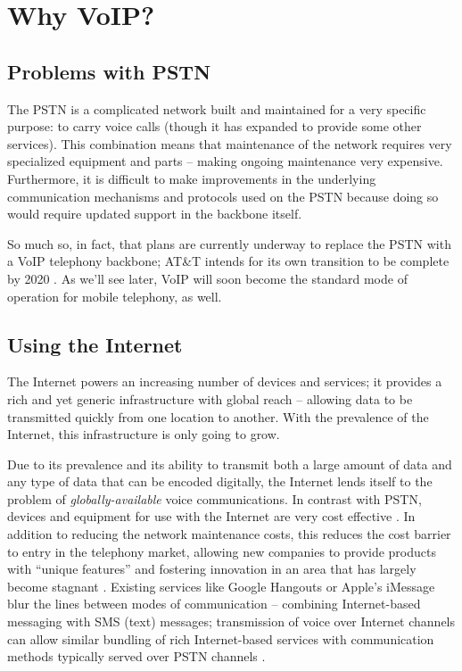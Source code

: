 \documentclass[11pt]{article}
\begin{document}
\section{Why VoIP?}

\subsection{Problems with PSTN}

The PSTN is a complicated network built and maintained for a very specific
purpose: to carry voice calls (though it has expanded to provide some other
services). This combination means that maintenance of the network requires very
specialized equipment and parts -- making ongoing maintenance very expensive.
Furthermore, it is difficult to make improvements in the underlying
communication mechanisms and protocols used on the PSTN because doing so would
require updated support in the backbone itself.  \cite{privateline}

So much so, in fact, that plans are currently underway to replace the PSTN with
a VoIP telephony backbone; AT\&T intends for its own transition to be complete
by 2020 \cite{networkworld,ars}. As we'll see later, VoIP will soon become the
standard mode of operation for mobile telephony, as well.

\subsection{Using the Internet}

The Internet powers an increasing number of devices and services; it provides a
rich and yet generic infrastructure with global reach -- allowing data to be
transmitted quickly from one location to another. With the prevalence of the
Internet, this infrastructure is only going to grow.

Due to its prevalence and its ability to transmit both a large amount of data
and any type of data that can be encoded digitally, the Internet lends itself to
the problem of \emph{globally-available} voice communications. In contrast with
PSTN, devices and equipment for use with the Internet are very cost effective
\cite{privateline}.  In addition to reducing the network maintenance costs, this
reduces the cost barrier to entry in the telephony market, allowing new
companies to provide products with ``unique features'' and fostering innovation
in an area that has largely become stagnant \cite{privateline}. Existing
services like Google Hangouts or Apple's iMessage blur the lines between modes
of communication -- combining Internet-based messaging with SMS (text) messages;
transmission of voice over Internet channels can allow similar bundling of rich
Internet-based services with communication methods typically served over PSTN
channels \cite{3gpp,privateline}. 
\end{document}

